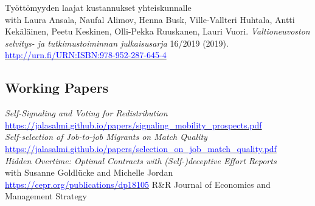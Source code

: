 \documentclass[16pt]{article}
\begin{document}
\noindent Ty\"{o}tt\"{o}myyden laajat kustannukset yhteiskunnalle \\
\noindent with Laura Ansala, Naufal Alimov, Henna Busk, Ville-Vallteri Huhtala, Antti Kek\"{a}l\"{a}inen, Peetu Keskinen, Olli-Pekka Ruuskanen, Lauri Vuori.  \textit{Valtioneuvoston selvitys- ja tutkimustoiminnan julkaisusarja} 16/2019 (2019).  \\
\noindent \href{http://urn.fi/URN:ISBN:978-952-287-645-4}{\textcolor{blue}{http://urn.fi/URN:ISBN:978-952-287-645-4}} \\


\subsection*{Working Papers}

\noindent \textit{Self-Signaling and Voting for Redistribution} \\ \href{https://jalasalmi.github.io/papers/signaling\_mobility\_prospects.pdf}{\textcolor{blue}{https://jalasalmi.github.io/papers/signaling\_mobility\_prospects.pdf}} \\

\noindent \textit{Self-selection of Job-to-job Migrants on Match Quality} \\ \href{https://jalasalmi.github.io/papers/selection\_on\_job\_match\_quality.pdf}{\textcolor{blue}{https://jalasalmi.github.io/papers/selection\_on\_job\_match\_quality.pdf}} \\

\noindent \textit{Hidden Overtime: Optimal Contracts with (Self-)deceptive Effort Reports} \\
with Susanne Goldlücke and Michelle Jordan \\  \href{https://cepr.org/publications/dp18105}{\textcolor{blue}{https://cepr.org/publications/dp18105}}  R\&R Journal of Economics and Management Strategy

%
%
%
\vfill
\end{document}
